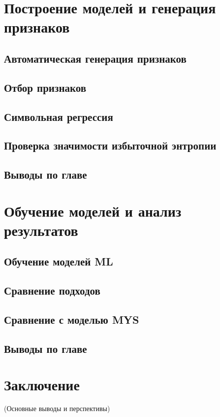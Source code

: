 \documentclass[a4paper,12pt]{article}
\begin{document}
\section{Построение моделей и генерация признаков}
  \subsection{Автоматическая генерация признаков}
  \subsection{Отбор признаков}
  \subsection{Символьная регрессия}
  \subsection{Проверка значимости избыточной энтропии}
  \subsection{Выводы по главе}
\newpage

\section{Обучение моделей и анализ результатов}
  \subsection{Обучение моделей ML}
  \subsection{Сравнение подходов}
  \subsection{Сравнение с моделью MYS}
  \subsection{Выводы по главе}
\newpage

\section*{Заключение}
(Основные выводы и перспективы)
\newpage
\end{document}
